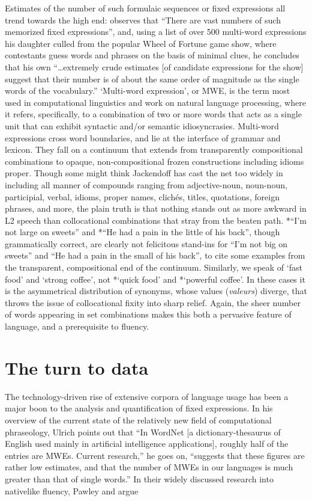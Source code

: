 \documentclass[output=paper]{langsci/langscibook}
\begin{document}
Estimates of the number of such formulaic sequences or fixed expressions all trend towards the high end: \citet[156]{jackendoff_architecture_1997} observes that “There are vast numbers of such memorized fixed expressions”, and, using a list of over 500 multi-word expressions his daughter culled from the popular Wheel of Fortune game show, where contestants guess words and phrases on the basis of minimal clues, he concludes that his own “…extremely crude estimates [of candidate expressions for the show] suggest that their number is of about the same order of magnitude as the single words of the vocabulary.” ‘Multi-word expression’, or MWE, is the term most used in computational linguistics and work on natural language processing, where it refers, specifically, to a combination of two or more words that acts as a single unit that can exhibit syntactic and/or semantic idiosyncrasies. Multi-word expressions cross word boundaries, and lie at the interface of grammar and lexicon. They fall on a continuum that extends from transparently compositional combinations to opaque, non-compositional frozen constructions including idioms proper. Though some might think Jackendoff has cast the net too widely in including all manner of compounds ranging from adjective-noun, noun-noun, participial, verbal, idioms, proper names, clichés, titles, quotations, foreign phrases, and more, the plain truth is that nothing stands out as more awkward in L2 speech than collocational combinations that stray from the beaten path. *“I’m not large on sweets” and *“He had a pain in the little of his back”, though grammatically correct, are clearly not felicitous stand-ins for “I’m not big on sweets” and “He had a pain in the small of his back”, to cite some examples from the transparent, compositional end of the continuum. Similarly, we speak of ‘fast food’ and ‘strong coffee’, not *‘quick food’ and *‘powerful coffee’. In these cases it is the asymmetrical distribution of synonyms, whose values (\textit{valeurs}) diverge, that throws the issue of collocational fixity into sharp relief. Again, the sheer number of words appearing in set combinations makes this both a pervasive feature of language, and a prerequisite to fluency. 

\section{The turn to data}

The technology-driven rise of extensive corpora of language usage has been a major boon to the analysis and quantification of fixed expressions. In his overview of the current state of the relatively new field of computational phraseology, Ulrich \citet[348]{granger_computational_2008} points out that “In WordNet [a dictionary-thesaurus of English used mainly in artificial intelligence applications], roughly half of the entries are MWEs. Current research,” he goes on, “suggests that these figures are rather low estimates, and that the number of MWEs in our languages is much greater than that of single words.” In their widely discussed research into nativelike fluency, Pawley and \citet[191-192]{richards_two_1983} argue 
\end{document}

